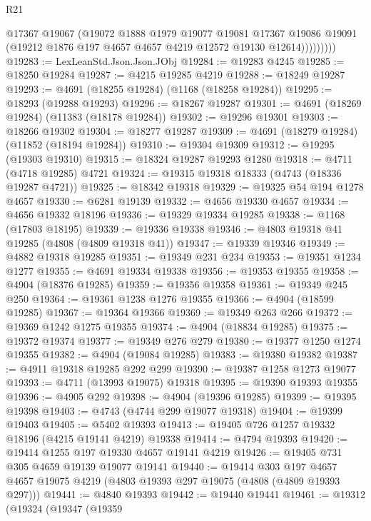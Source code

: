 \begin{lexlean}{R21}
\begin{coremodule}
                  @17367
                  @19067
                  (@19072
                    @1888
                    @1979
                    @19077
                    @19081
                    @17367
                    @19086
                    @19091
                    (@19212 @1876 @197 @4657 @4657 @4219 @12572 @19130 @12614)))))))))
@19283 := LexLeanStd.Json.Json.JObj
@19284 := @19283 @4245
@19285 := @18250 @19284
@19287 := @4215 @19285 @4219
@19288 := @18249 @19287
@19293 := @4691 (@18255 @19284) (@1168 (@18258 @19284))
@19295 := @18293 (@19288 @19293)
@19296 := @18267 @19287
@19301 := @4691 (@18269 @19284) (@11383 (@18178 @19284))
@19302 := @19296 @19301
@19303 := @18266 @19302
@19304 := @18277 @19287
@19309 := @4691 (@18279 @19284) (@11852 (@18194 @19284))
@19310 := @19304 @19309
@19312 := @19295 (@19303 @19310)
@19315 := @18324 @19287 @19293 @1280
@19318 := @4711 (@4718 @19285) @4721
@19324 := @19315 @19318 @18333 (@4743 (@18336 @19287 @4721))
@19325 := @18342 @19318
@19329 := @19325 @54 @194 @1278 @4657
@19330 := @6281 @19139
@19332 := @4656 @19330 @4657
@19334 := @4656 @19332 @18196
@19336 := @19329 @19334 @19285
@19338 := @1168 (@17803 @18195)
@19339 := @19336 @19338
@19346 := @4803 @19318 @41 @19285 (@4808 (@4809 @19318 @41))
@19347 := @19339 @19346
@19349 := @4882 @19318 @19285
@19351 := @19349 @231 @234
@19353 := @19351 @1234 @1277
@19355 := @4691 @19334 @19338
@19356 := @19353 @19355
@19358 := @4904 (@18376 @19285)
@19359 := @19356 @19358
@19361 := @19349 @245 @250
@19364 := @19361 @1238 @1276 @19355
@19366 := @4904 (@18599 @19285)
@19367 := @19364 @19366
@19369 := @19349 @263 @266
@19372 := @19369 @1242 @1275 @19355
@19374 := @4904 (@18834 @19285)
@19375 := @19372 @19374
@19377 := @19349 @276 @279
@19380 := @19377 @1250 @1274 @19355
@19382 := @4904 (@19084 @19285)
@19383 := @19380 @19382
@19387 := @4911 @19318 @19285 @292 @299
@19390 := @19387 @1258 @1273 @19077
@19393 := @4711 (@13993 @19075) @19318
@19395 := @19390 @19393 @19355
@19396 := @4905 @292
@19398 := @4904 (@19396 @19285)
@19399 := @19395 @19398
@19403 := @4743 (@4744 @299 @19077 @19318)
@19404 := @19399 @19403
@19405 := @5402 @19393
@19413 := @19405 @726 @1257 @19332 @18196 (@4215 @19141 @4219) @19338
@19414 := @4794 @19393
@19420 := @19414 @1255 @197 @19330 @4657 @19141 @4219
@19426 := @19405 @731 @305 @4659 @19139 @19077 @19141
@19440 := @19414
    @303
    @197
    @4657
    @4657
    @19075
    @4219
    (@4803 @19393 @297 @19075 (@4808 (@4809 @19393 @297)))
@19441 := @4840 @19393
@19442 := @19440 @19441
@19461 := @19312
    (@19324
      (@19347
        (@19359

\end{coremodule}
\end{lexlean}
